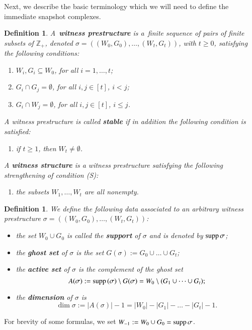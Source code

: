 \documentclass{amsart}[10pt]
\newtheorem{df}[theorem]{Definition}
\newcommand{\supp}{\text{\rm supp}\,}
\newcommand{\zz}{{\mathbb Z}}
\numberwithin{equation}{section}
\numberwithin{figure}{section}
\numberwithin{table}{section}
\begin{document}
\nin Next, we describe the basic terminology which we will need to
define the immediate snapshot complexes.

\begin{df}\label{df:ws}
A~{\bf witness prestructure} is a~finite sequence of pairs of finite
subsets of $\zz_+$, denoted $\sigma=((W_0,G_0),\dots,(W_t,G_t))$, with
$t\geq 0$, satisfying the following conditions:
\begin{enumerate}
\item[(P1)] $W_i,G_i\subseteq W_0$, for all $i=1,\dots,t$;
\item[(P2)] $G_i\cap G_j=\emptyset$, for all $i,j\in[t]$, $i<j$;
\item[(P3)] $G_i\cap W_j=\emptyset$, for all $i,j\in[t]$, $i\leq j$.
\end{enumerate}

\noindent
A witness prestructure is called {\bf stable} if in addition the
following condition is satisfied:
\begin{enumerate}
\item[(S)] if $t\geq 1$, then $W_t\neq\emptyset$.
\end{enumerate}

\noindent
A {\bf witness structure} is a witness prestructure satisfying the
following strengthening of condition (S):
\begin{enumerate}
\item[(W)] the subsets $W_1,\dots,W_t$ are all nonempty.
\end{enumerate}
\end{df}

\begin{df}
We define the following data associated to an arbitrary witness
prestructure $\sigma=((W_0,G_0),\dots,(W_t,G_t))$:
\begin{itemize}
\item the set $W_0\cup G_0$ is called the {\bf support} of $\sigma$ and is
denoted by $\supp\sigma$;
\item the {\bf ghost set} of $\sigma$ is the set
  $G(\sigma):=G_0\cup\dots\cup G_t$;
\item the {\bf active set} of $\sigma$ is the complement of the ghost set
\[A(\sigma):=\supp(\sigma)\setminus G(\sigma)=W_0\setminus(G_1\cup\dots\cup G_t);\]
\item the {\bf dimension} of $\sigma$ is
  \[\dim\sigma:=|A(\sigma)|-1=|W_0|-|G_1|-\dots-|G_t|-1.\]
\end{itemize}
\end{df}
\noindent
For brevity of some formulas, we set $W_{-1}:=W_0\cup G_0=\supp\sigma$.
\end{document}
